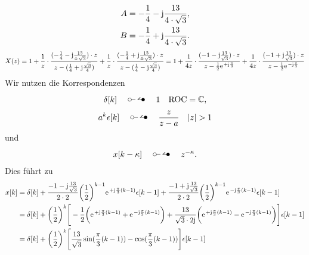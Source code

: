 \documentclass[11pt,a4paper,DIV=12]{scrartcl}
\begin{document}
\begin{align}
	A=-\frac{1}{4}-\im\frac{13}{4\cdot\sqrt{3}}, \nonumber \\
	B=-\frac{1}{4}+\im\frac{13}{4\cdot\sqrt{3}}.
\end{align}
\begin{align}
	X(z)=1+\frac{1}{z}\cdot\frac{(-\frac{1}{4}-\im\frac{13}{4\cdot\sqrt{3}})\cdot z}{z-(\frac{1}{4}+\im\frac{\sqrt{3}}{4})}+\frac{1}{z}\cdot\frac{(-\frac{1}{4}+\im\frac{13}{4\cdot\sqrt{3}})\cdot z}{z-(\frac{1}{4}-\im\frac{\sqrt{3}}{4})}=1+\frac{1}{4z}\cdot\frac{(-1-\im\frac{13}{\sqrt{3}})\cdot z}{z-\frac{1}{2}\e^{+\im\frac{\pi}{3}}}+\frac{1}{4z}\cdot\frac{(-1+\im\frac{13}{\sqrt{3}})\cdot z}{z-\frac{1}{2}\e^{-\im\frac{\pi}{3}}}
\end{align}
Wir nutzen die Korrespondenzen
\begin{align}
	\delta[k]\quad\ztransf\quad1\quad\mathrm{ROC}=\mathbb{C},
\end{align}
\begin{align}
	a^k\epsilon[k]\quad\ztransf\quad\frac{z}{z-a}\quad|z|>1
\end{align}
und
\begin{align}
	x[k-\kappa]\quad\ztransf\quad z^{-\kappa}.
\end{align}
Dies führt zu
\begin{align}
	x[k]&=\delta[k]+\frac{-1-\im\frac{13}{\sqrt{3}}}{2\cdot2}\bigg(\frac{1}{2}\bigg)^{k-1}\e^{+\im\frac{\pi}{3}(k-1)}\epsilon[k-1]+\frac{-1+\im\frac{13}{\sqrt{3}}}{2\cdot2}\bigg(\frac{1}{2}\bigg)^{k-1}\e^{-\im\frac{\pi}{3}(k-1)}\epsilon[k-1] \nonumber\\
	&=\delta[k]+\bigg(\frac{1}{2}\bigg)^{k}\Bigg[-\frac{1}{2}\bigg(\e^{+\im\frac{\pi}{3}(k-1)}+\e^{-\im\frac{\pi}{3}(k-1)}\bigg)+\frac{13}{\sqrt{3}\cdot2\im}\bigg(\e^{+\im\frac{\pi}{3}(k-1)}-\e^{-\im\frac{\pi}{3}(k-1)}\bigg)\Bigg ]\epsilon[k-1]\nonumber\\
	&=\delta[k]+\bigg(\frac{1}{2}\bigg)^k\Bigg[\frac{13}{\sqrt{3}}\sin(\frac{\pi}{3}(k-1))-\cos(\frac{\pi}{3}(k-1))\Bigg]\epsilon[k-1]
\end{align}

\end{document}

